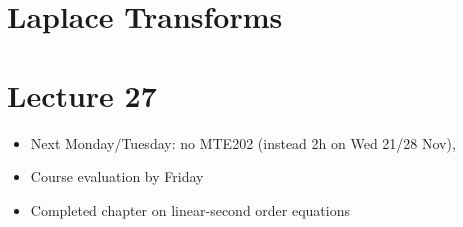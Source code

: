 \chapter{Laplace Transforms}
\chapter*{Lecture 27}

\begin{recall}{}{}
\begin{itemize}
\item Next Monday/Tuesday: no MTE202 (instead 2h on Wed 21/28 Nov), 
 \item Course evaluation by Friday
\item Completed chapter on linear-second order equations
\end{itemize}
\end{recall}


